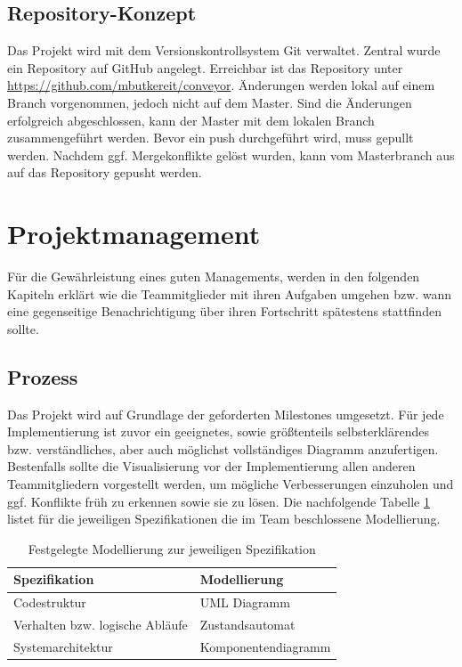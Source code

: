 \documentclass[a4paper, 11pt]{article}
\begin{document}
\newpage

\subsection{Repository-Konzept}
Das Projekt wird mit dem Versionskontrollsystem Git verwaltet. Zentral wurde ein Repository auf GitHub angelegt. Erreichbar ist das Repository unter \url{https://github.com/mbutkereit/conveyor}. Änderungen werden lokal auf einem Branch vorgenommen, jedoch nicht auf dem Master. Sind die Änderungen erfolgreich abgeschlossen, kann der Master mit dem lokalen Branch zusammengeführt werden. Bevor ein push durchgeführt wird, muss gepullt werden. Nachdem ggf. Mergekonflikte gelöst wurden, kann vom Masterbranch aus auf das Repository gepusht werden.

\section{Projektmanagement}
Für die Gewährleistung eines guten Managements, werden in den folgenden Kapiteln erklärt wie die Teammitglieder mit ihren Aufgaben umgehen bzw. wann eine gegenseitige Benachrichtigung über ihren Fortschritt spätestens stattfinden sollte.

\subsection{Prozess}
Das Projekt wird auf Grundlage der geforderten Milestones umgesetzt. Für jede Implementierung ist zuvor ein geeignetes, sowie größtenteils selbsterklärendes bzw. verständliches, aber auch möglichst vollständiges Diagramm anzufertigen. Bestenfalls sollte die Visualisierung vor der Implementierung allen anderen Teammitgliedern vorgestellt werden, um mögliche Verbesserungen einzuholen und ggf. Konflikte früh zu erkennen sowie sie zu lösen. Die nachfolgende Tabelle \ref{visuals} listet für die jeweiligen Spezifikationen die im Team beschlossene Modellierung.

\begin{table}[h]
\center
\begin{tabularx}{\textwidth}{|l|X|}
\hline
\textbf{Spezifikation}&\textbf{Modellierung}\\
\hline
Codestruktur&UML Diagramm\\
\hline
Verhalten bzw. logische Abläufe&Zustandsautomat\\
\hline
Systemarchitektur&Komponentendiagramm\\
\hline
\end{tabularx}
\caption{Festgelegte Modellierung zur jeweiligen Spezifikation}
\label{visuals}
\end{table}
\end{document}
